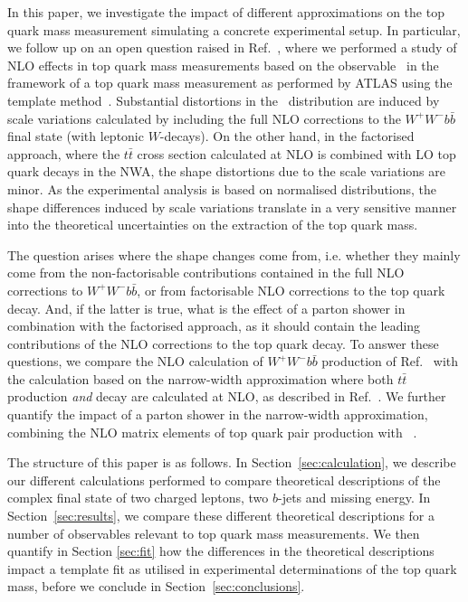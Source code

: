 In this paper, we investigate the impact of different
approximations on the top quark mass measurement simulating a concrete experimental setup. 
In particular, we follow up on an open question raised in Ref.~\cite{Heinrich:2013qaa}, where 
we performed a study of NLO effects in top quark mass
measurements based on the observable \mlb\ in the framework of a top quark mass measurement as performed by ATLAS
using the template method~\cite{Aad:2015nba,Aaboud:2016igd}. 
Substantial distortions in the \mlb\ distribution are induced by scale variations 
calculated by including  the full NLO corrections to the $W^+W^- b\bar{b}$ final state
(with leptonic $W$-decays). On the other hand, in the factorised
approach, where the $t\bar{t}$ cross section calculated at NLO is
combined with  LO top quark decays in the NWA, the shape distortions
due to the scale variations  are minor. 
As the experimental analysis is based on normalised distributions, the
shape differences induced by scale variations translate in a very
sensitive manner into the theoretical uncertainties on the extraction
of the top quark mass.

The question arises where the shape changes come from, i.e. whether they mainly
come from the non-factorisable contributions contained in the full NLO
corrections to $W^+W^- b\bar{b}$, or from factorisable NLO corrections to the top quark decay. 
And, if the latter is true, what is the effect of a parton shower in
combination with the factorised approach, as it should contain the
leading contributions of the NLO corrections to the top
quark decay.
To answer these questions, we compare the NLO calculation of $W^+W^- b\bar{b}$
production of Ref.~\cite{Heinrich:2013qaa} with the calculation based
on the narrow-width approximation 
where both $t\bar{t}$ production {\it and} decay are calculated at NLO,
as described in Ref.~\cite{Melnikov:2009dn}.
We further quantify the impact of a parton shower in the narrow-width
approximation, combining the NLO matrix elements of top quark pair
production with ~\cite{Gleisberg:2008ta}.

The structure of this paper is as follows. 
In Section~\ref{sec:calculation}, we describe our different
calculations performed to compare theoretical
descriptions of the complex final state of two charged leptons, two
$b$-jets and missing energy. In Section~\ref{sec:results}, we 
compare these different theoretical descriptions for a number of
observables relevant to top quark mass measurements. 
We then quantify in Section \ref{sec:fit} how the differences in
the theoretical descriptions impact a template fit as utilised
in experimental determinations
of the top quark mass, before we conclude in Section~\ref{sec:conclusions}.
